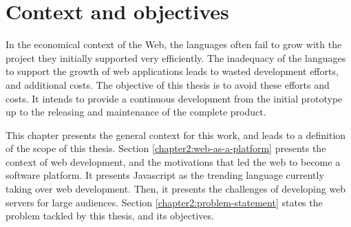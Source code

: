 \chapter{Context and objectives} \label{chapter2}
\minitoc
\eject

In the economical context of the Web, the languages often fail to grow with the project they initially supported very efficiently.
The inadequacy of the languages to support the growth of web applications leads to wasted development efforts, and additional costs.
The objective of this thesis is to avoid these efforts and costs.
It intends to provide a continuous development from the initial prototype up to the releasing and maintenance of the complete product.

This chapter presents the general context for this work, and leads to a definition of the scope of this thesis.
Section \ref{chapter2:web-as-a-platform} presents the context of web development, and the motivations that led the web to become a software platform.
It presents Javascript as the trending language currently taking over web development.
Then, it presents the challenges of developing web servers for large audiences.
Section \ref{chapter2:problem-statement} states the problem tackled by this thesis, and its objectives.


